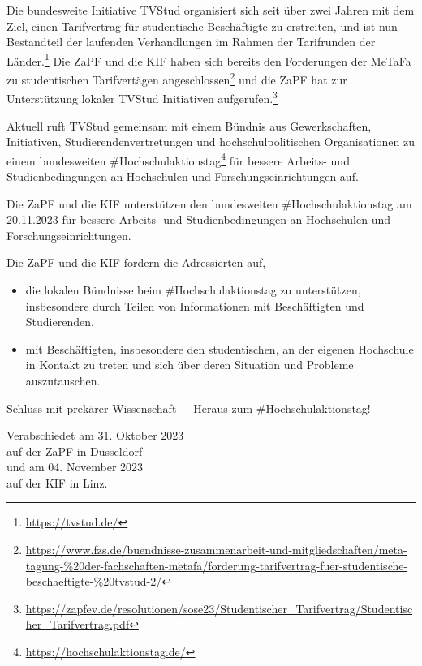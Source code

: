 \documentclass[DIV=calc]{scrartcl}
\begin{document}
Die bundesweite Initiative TVStud organisiert sich seit über zwei Jahren mit dem Ziel, einen Tarifvertrag für studentische Beschäftigte zu erstreiten, und ist nun Bestandteil der laufenden Verhandlungen im Rahmen der Tarifrunden der Länder.\footnote{\url{https://tvstud.de/}} Die ZaPF und die KIF haben sich bereits den Forderungen der MeTaFa zu studentischen Tarifvertägen angeschlossen\footnote{\url{https://www.fzs.de/buendnisse-zusammenarbeit-und-mitgliedschaften/meta-tagung-\%20der-fachschaften-metafa/forderung-tarifvertrag-fuer-studentische-beschaeftigte-\%20tvstud-2/}} und die ZaPF hat zur Unterstützung lokaler TVStud Initiativen aufgerufen.\footnote{\url{https://zapfev.de/resolutionen/sose23/Studentischer_Tarifvertrag/Studentischer_Tarifvertrag.pdf}}

Aktuell ruft TVStud gemeinsam mit einem Bündnis aus Gewerkschaften, Initiativen, Studierendenvertretungen und hochschulpolitischen Organisationen zu einem bundesweiten \#Hochschulaktionstag\footnote{\url{https://hochschulaktionstag.de/}} für bessere Arbeits- und Studienbedingungen an Hochschulen und Forschungseinrichtungen auf.

Die ZaPF und die KIF unterstützen den bundesweiten \#Hochschulaktionstag am 20.11.2023 für bessere Arbeits- und Studienbedingungen an Hochschulen und Forschungseinrichtungen. 

Die ZaPF und die KIF fordern die Adressierten auf,
\begin{itemize}
    \item die lokalen Bündnisse beim \#Hochschulaktionstag zu unterstützen, insbesondere durch Teilen von Informationen mit Beschäftigten und Studierenden.
    \item mit Beschäftigten, insbesondere den studentischen, an der eigenen Hochschule in Kontakt zu treten und sich über deren Situation und Probleme auszutauschen.
\end{itemize}

Schluss mit prekärer Wissenschaft –- Heraus zum \#Hochschulaktionstag!


%
\vfill
\begin{flushright}
	Verabschiedet am 31. Oktober 2023 \\
	auf der ZaPF in Düsseldorf\\
 \vspace{0.2 cm}
    und am 04. November 2023\\
    auf der KIF in Linz.
\end{flushright}
\end{document}
